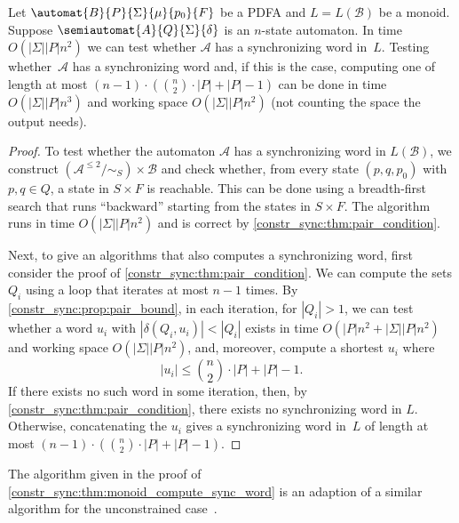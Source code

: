 \begin{theorem}\label{constr_sync:thm:monoid_compute_sync_word}
	Let $\automat{B}{P}{\Sigma}{\mu}{p_0}{F}$
	be a PDFA
	and $L = L(\mathcal B)$ be a monoid.
	Suppose $\semiautomat{A}{Q}{\Sigma}{\delta}$
	is an $n$-state automaton.	
	In time $O(|\Sigma||P|n^2)$
	we can test whether $\mathcal A$
	has a synchronizing word in~$L$.
	Testing whether~$\mathcal A$ has a synchronizing word
	and, if this is the case,
	computing one of length at most 
	$(n - 1) \cdot (  \binom{n}{2} \cdot |P| + |P| - 1 )$
	can be done in time $O(|\Sigma||P|n^3)$ and working space $O(|\Sigma||P|n^2)$ (not counting the space the output needs).
\end{theorem}
\begin{proof}
	To test whether the automaton $\mathcal A$ has a 
	synchronizing word in $L(\mathcal B)$, we construct 
	$( \mathcal A^{\le 2} / {\sim_S} ) \times \mathcal B$ and check whether, 
	from every state $({p,q}, p_0)$ with $p,q \in Q$, a state in ${S} \times F$ is reachable.
	This can be done using a breadth-first search that runs ``backward''  starting from the states in ${S} \times F$.
	The algorithm runs in time $O(|\Sigma||P|n^2)$ and is correct by \cref{constr_sync:thm:pair_condition}.
		
	Next, to give an algorithms that also computes a synchronizing word, 
	first consider the proof of \cref{constr_sync:thm:pair_condition}.
	We can compute the sets $Q_i$ using a loop that iterates at most $n - 1$ times.	
	By \cref{constr_sync:prop:pair_bound}, in each iteration, for $|Q_i| > 1$,
	we can test whether a word $u_i$
	with $|\delta(Q_i, u_i)| < |Q_i|$
	exists in time 
	$O(|P|n^2 + |\Sigma||P|n^2)$
	and working space $O(|\Sigma||P|n^2)$,
	and, moreover, compute a shortest $u_i$ where 
	\[
	|u_i| \le \binom{n}{2} \cdot |P| + |P| - 1.
	\]
	If there exists no such word in some iteration, then, by \cref{constr_sync:thm:pair_condition},
	there exists no synchronizing word in $L$.
	Otherwise, concatenating the $u_i$
	gives a synchronizing word in~$L$
	of length at most $(n - 1) \cdot (  \binom{n}{2} \cdot |P| + |P| - 1 )$.
\end{proof}

The algorithm given in the proof of \cref{constr_sync:thm:monoid_compute_sync_word} is an adaption 
of a similar algorithm for the unconstrained case~\cite{Eppstein90,Sandberg04,DBLP:conf/lata/Volkov08}.
 
